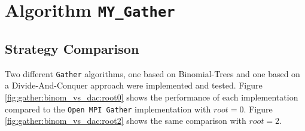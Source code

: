 
\newcommand\mygather{\texttt{MY\_Gather}\xspace}
\newcommand\myscatter{\texttt{MY\_Scatter}\xspace}

\newcommand\mpigather{\texttt{MPI\_Gather}\xspace}
\newcommand\mpiscatter{\texttt{MPI\_Scatter}\xspace}

\section{Algorithm \mygather}

\subsection{Strategy Comparison}

Two different \texttt{Gather} algorithms, one based on Binomial-Trees and one based on a Divide-And-Conquer approach were implemented and tested. Figure \ref{fig:gather:binom_vs_dac:root0} shows the performance of each implementation compared to the \texttt{Open MPI Gather} implementation with $root = 0$. Figure \ref{fig:gather:binom_vs_dac:root2} shows the same comparison with $root = 2$.

